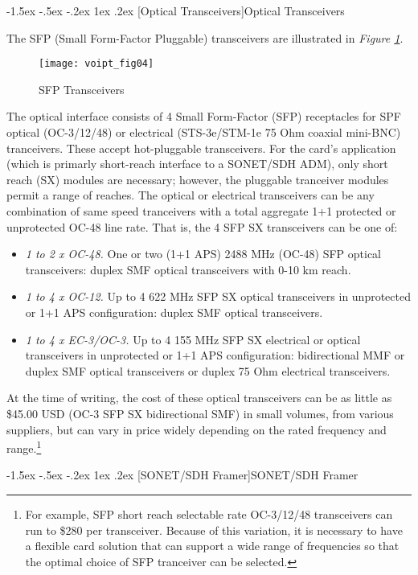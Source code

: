 \documentclass[letterpaper,final,notitlepage,twocolumn,10pt,twoside]{article}
\makeatletter
\renewcommand\subsection{\@startsection{subsection}{2}{\z@}%
                                     {-1.5ex \@plus -.5ex \@minus -.2ex}%
                                     {1ex \@plus .2ex}%
                                     {\normalfont\normalsize\bfseries}}
\makeatother
\begin{document}
\subsection[Optical Transceivers]{Optical Transceivers}

The SFP (Small Form-Factor Pluggable) transceivers are illustrated in
\textsl{Figure \ref{figure:voipt_fig04}}.
\begin{figure}[htp]
\center\texttt{[image: voipt\_fig04]}
\caption[Tranceivers]{SFP Transceivers}
\label{figure:voipt_fig04}
\end{figure}
The optical interface consists of 4 Small Form-Factor (SFP) receptacles for SPF
optical (OC-3/12/48) or electrical (STS-3e/STM-1e 75 Ohm coaxial mini-BNC)
tranceivers.  These accept hot-pluggable transceivers.  For the card's
application (which is primarly short-reach interface to a SONET/SDH ADM), only
short reach (SX) modules are necessary; however, the pluggable tranceiver
modules permit a range of reaches.  The optical or electrical transceivers can
be any combination of same speed tranceivers with a total aggregate 1+1
protected or unprotected OC-48 line rate.
That is, the 4 SFP SX transceivers can be one of:
\begin{itemize}
\item \textsl{1 to 2 x OC-48.}
	One or two (1+1 APS) 2488 MHz (OC-48) SFP optical transceivers: duplex
	SMF optical transceivers with 0-10 km reach.
\item \textsl{1 to 4 x OC-12.}
	Up to 4 622 MHz SFP SX optical transceivers in unprotected or 1+1 APS
	configuration: duplex SMF optical transceivers.
\item \textsl{1 to 4 x EC-3/OC-3.}
	Up to 4 155 MHz SFP SX electrical or optical transceivers in unprotected
	or 1+1 APS configuration: bidirectional MMF or duplex SMF optical
	transceivers or duplex 75 Ohm electrical transceivers.
\end{itemize}
At the time of writing, the cost of these optical transceivers can be as little
as \$45.00 USD (OC-3 SFP SX bidirectional SMF) in small volumes, from various
suppliers, but can vary in price widely depending on the rated frequency and
range.\footnote{For example, SFP short reach selectable rate OC-3/12/48
transceivers can run to \$280 per transceiver.  Because of this variation, it
is necessary to have a flexible card solution that can support a wide range of
frequencies so that the optimal choice of SFP tranceiver can be selected.}

\subsection[SONET/SDH Framer]{SONET/SDH Framer}
\end{document}
